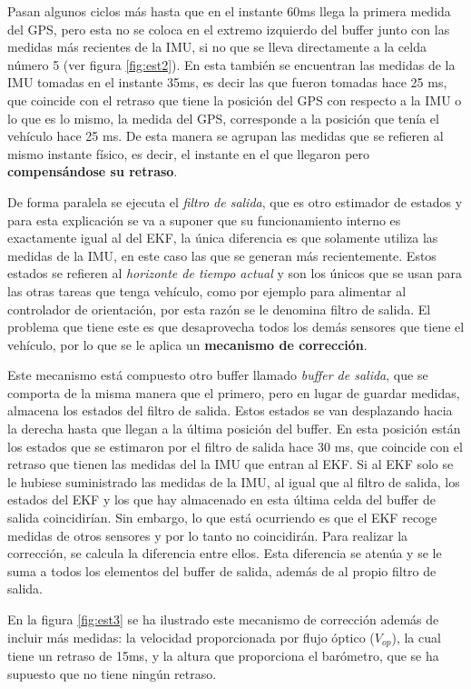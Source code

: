 Pasan algunos ciclos más hasta que en el instante 60ms llega la primera medida del GPS, pero esta no se coloca en el extremo izquierdo del buffer junto con las medidas más recientes de la IMU, si no que se lleva directamente a la celda número 5 (ver figura \ref{fig:est2}). En esta también se encuentran las medidas de la IMU tomadas en el instante 35ms, es decir las que fueron tomadas hace 25 ms, que coincide con el retraso que tiene la posición del GPS con respecto a la IMU o lo que es lo mismo, la medida del GPS, corresponde a la posición que tenía el vehículo hace 25 ms. De esta manera se agrupan las medidas que se refieren al mismo instante físico, es decir, el instante en el que llegaron pero {\bfseries compensándose su retraso}. 


De forma paralela se ejecuta el \textit{filtro de salida}, que es otro estimador de estados y para esta explicación se va a suponer que su funcionamiento interno es exactamente igual al del EKF, la única diferencia es que solamente utiliza las medidas de la IMU, en este caso las que se generan más recientemente. Estos estados se refieren al \textit{horizonte de tiempo actual} y son los únicos que se usan para las otras tareas que tenga vehículo, como por ejemplo para alimentar al controlador de orientación, por esta razón se le denomina filtro de salida. El problema que tiene este es que desaprovecha todos los demás sensores que tiene el vehículo, por lo que se le aplica un \textbf{mecanismo de corrección}.  

Este mecanismo está compuesto otro buffer llamado \textit{buffer de salida}, que se comporta de la misma manera que el primero, pero en lugar de guardar medidas, almacena los estados del filtro de salida. Estos estados se van desplazando hacia la derecha hasta que llegan a la última posición del buffer. En esta posición están los estados que se estimaron por el filtro de salida hace 30 ms, que coincide con el retraso que tienen las medidas del la IMU que entran al EKF. Si al EKF solo se le hubiese suministrado las medidas de la IMU, al igual que al filtro de salida, los estados del EKF y los que hay almacenado en esta última celda del buffer de salida coincidirían. Sin embargo, lo que está ocurriendo es que el EKF recoge medidas de otros sensores y por lo tanto no coincidirán. Para realizar la corrección, se calcula la diferencia entre ellos. Esta diferencia se atenúa y se le suma a todos los elementos del buffer de salida, además de al propio filtro de salida. 

En la figura \ref{fig:est3} se ha ilustrado este mecanismo de corrección además de incluir más medidas: la velocidad proporcionada por flujo óptico ($V_{op}$), la cual tiene un retraso de 15ms, y la altura que proporciona el barómetro, que se ha supuesto que no tiene ningún retraso. 

